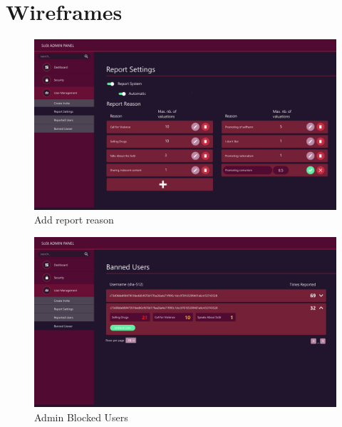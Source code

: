 
\chapter{Wireframes}\label{ch:wireframes}

\begin{figure}[h]
    \centering
    \includegraphics[width=1.0\textwidth]{./graphics/wireframes/AdminReportSettings-AddReportReason}
    \caption{Add report reason}
    \label{fig:figure6}
\end{figure}

\begin{figure}[h]
    \centering
    \includegraphics[width=1.0\textwidth]{./graphics/wireframes/AdminBlockedUsers}
    \caption{Admin Blocked Users}
    \label{fig:figure7}
\end{figure}

